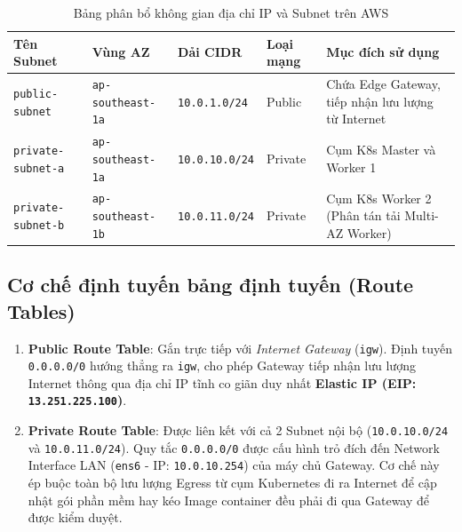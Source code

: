 \begin{table}[H]
    \centering
    \small
    \renewcommand{\arraystretch}{1.25}
    \caption{Bảng phân bổ không gian địa chỉ IP và Subnet trên AWS}
    \label{tab:subnets}
    \begin{tabularx}{\textwidth}{l l l l X}
        \toprule
        \textbf{Tên Subnet} & \textbf{Vùng AZ} & \textbf{Dải CIDR} & \textbf{Loại mạng} & \textbf{Mục đích sử dụng} \\
        \midrule
        \texttt{public-subnet} & \texttt{ap-southeast-1a} & \texttt{10.0.1.0/24} & Public & Chứa Edge Gateway, tiếp nhận lưu lượng từ Internet \\
        \texttt{private-subnet-a} & \texttt{ap-southeast-1a} & \texttt{10.0.10.0/24} & Private & Cụm K8s Master và Worker 1 \\
        \texttt{private-subnet-b} & \texttt{ap-southeast-1b} & \texttt{10.0.11.0/24} & Private & Cụm K8s Worker 2 (Phân tán tải Multi-AZ Worker) \\
        \bottomrule
    \end{tabularx}
\end{table}

\subsection{Cơ chế định tuyến bảng định tuyến (Route Tables)}
\begin{enumerate}
    \item \textbf{Public Route Table}: Gắn trực tiếp với \textit{Internet Gateway} (\texttt{igw}). Định tuyến \texttt{0.0.0.0/0} hướng thẳng ra \texttt{igw}, cho phép Gateway tiếp nhận lưu lượng Internet thông qua địa chỉ IP tĩnh co giãn duy nhất \textbf{Elastic IP (EIP: \texttt{13.251.225.100})}.
    \item \textbf{Private Route Table}: Được liên kết với cả 2 Subnet nội bộ (\texttt{10.0.10.0/24} và \texttt{10.0.11.0/24}). Quy tắc \texttt{0.0.0.0/0} được cấu hình trỏ đích đến Network Interface LAN (\texttt{ens6} - IP: \texttt{10.0.10.254}) của máy chủ Gateway. Cơ chế này ép buộc toàn bộ lưu lượng Egress từ cụm Kubernetes đi ra Internet để cập nhật gói phần mềm hay kéo Image container đều phải đi qua Gateway để được kiểm duyệt.
\end{enumerate}

